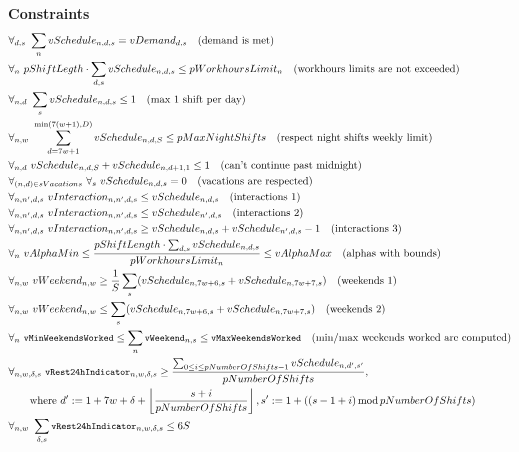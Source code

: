 \documentclass{article}
\newcommand{\varWeekendWorkedIndicator}[2]{\texttt{\small vWeekend}_{#1, #2}}
\newcommand{\varMinWeekendsWorked}{\texttt{\small vMinWeekendsWorked}}
\newcommand{\varMaxWeekendsWorked}{\texttt{\small vMaxWeekendsWorked}}
\newcommand{\varDayLengthBreakIndicator}[4]{\texttt{\small vRest24hIndicator}_{#1, #2, #3, #4}}
\begin{document}
\textbf{Constraints}
\begin{align*}
&\forall_{d,s}\ \sum_n vSchedule_{n,d,s} = vDemand_{d, s}\quad \text{(demand is met)} \\
&\forall_{n}\ pShiftLegth\cdot\sum_{d, s} vSchedule_{n,d,s} \leq pWorkhoursLimit_n \quad \text{(workhours limits are not exceeded)} \\
&\forall_{n,d}\ \sum_s vSchedule_{n,d,s} \leq 1\quad \text{(max 1 shift per day)} \\
&\forall_{n,w}\ \sum_{d=7w+1}^{\min(7(w+1), D)} vSchedule_{n,d,S} \leq pMaxNightShifts \quad \text{(respect night shifts weekly limit)} \\
&\forall_{n,d}\ vSchedule_{n,d,S}+vSchedule_{n,d+1,1} \leq 1\quad \text{(can't continue past midnight)} \\
&\forall_{(n,d)\in sVacations}\ \forall_s\ vSchedule_{n,d,s} = 0\quad \text{(vacations are respected)} \\
&\forall_{n,n',d,s}\ vInteraction_{n,n',d,s} \leq vSchedule_{n,d,s}\quad \text{(interactions 1)} \\
&\forall_{n,n',d,s}\ vInteraction_{n,n',d,s} \leq vSchedule_{n',d,s}\quad \text{(interactions 2)} \\
&\forall_{n,n',d,s}\ vInteraction_{n,n',d,s} \geq vSchedule_{n,d,s}+vSchedule_{n',d,s}-1\quad \text{(interactions 3)} \\
&\forall_{n}\ vAlphaMin \leq \frac{pShiftLength\cdot\sum_{d,s}vSchedule_{n,d,s}}{pWorkhoursLimit_n} \leq vAlphaMax\quad \text{(alphas with bounds)} \\
&\forall_{n, w}\ vWeekend_{n, w} \geq \frac{1}{S}\sum_s (vSchedule_{n, 7w+6, s} + vSchedule_{n, 7w+7, s}) \quad \text{(weekends 1)} \\
&\forall_{n, w}\ vWeekend_{n, w} \leq \sum_s (vSchedule_{n, 7w+6, s} + vSchedule_{n, 7w+7, s}) \quad \text{(weekends 2)} \\
&\forall_{n}\ \varMinWeekendsWorked \le \sum_n \varWeekendWorkedIndicator{n}{s} \le \varMaxWeekendsWorked \quad \text{(min/max weekends worked are computed)} \\
&\forall_{n,w,\delta,s}\ \varDayLengthBreakIndicator{n}{w}{\delta}{s} \ge \frac{\sum_{0 \le i \le pNumberOfShifts - 1} vSchedule_{n, d', s'}}{pNumberOfShifts}, \\
    &\qquad\text{where } d' := 1+7w+\delta+\left\lfloor\frac{s+i}{pNumberOfShifts}\right\rfloor, s' := 1 + ((s - 1 + i) \operatorname{mod} pNumberOfShifts) \\
&\forall_{n, w}\ \sum_{\delta, s} \varDayLengthBreakIndicator{n}{w}{\delta}{s} \le 6S
\end{align*}
\end{document}
